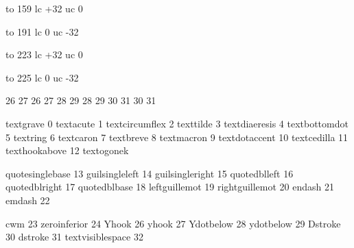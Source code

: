 

\startencoding[t5]

 to 159 lc +32 uc   0

 to 191 lc   0 uc -32

 to 223 lc +32 uc   0

 to 225 lc   0 uc -32

 26 27  26 27
 28 29  28 29
 30 31  30 31

 textgrave             0
 textacute             1
 textcircumflex        2
 texttilde             3
 textdiaeresis         4
 textbottomdot         5
 textring              6
 textcaron             7
 textbreve             8
 textmacron            9
 textdotaccent        10
 textcedilla          11
 texthookabove        12
 textogonek           {}

 quotesinglebase      13
 guilsingleleft       14
 guilsingleright      15
 quotedblleft         16
 quotedblright        17
 quotedblbase         18
 leftguillemot        19
 rightguillemot       20
 endash               21
 emdash               22

 cwm                  23
 zeroinferior         24
 Yhook                26
 yhook                27
 Ydotbelow            28
 ydotbelow            29
 Dstroke              30
 dstroke              31
 textvisiblespace     32

